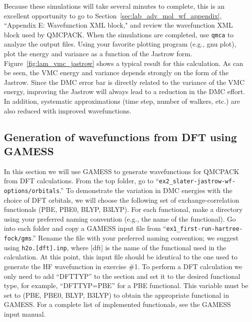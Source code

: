 Because these simulations will take several minutes to complete, this is an excellent opportunity
to go to Section~\ref{sec:lab_adv_mol_wf_appendix}, ``Appendix E: Wavefunction XML block," and review the wavefunction XML block used by QMCPACK. When the
simulations are completed, use \texttt{qmca} to analyze the output files. Using your favorite plotting
program (e.g., gnu plot), plot the energy and variance as a function of the Jastrow form.
Figure~\ref{fig:lam_vmc_jastrow} shows a typical result for this calculation. As can be seen, the VMC energy and
variance depends strongly on the form of the Jastrow. Since the DMC error bar is directly
related to the variance of the VMC energy, improving the Jastrow will always lead to a
reduction in the DMC effort. In addition, systematic approximations (time step, number of
walkers, etc.) are also reduced with improved wavefunctions.


\subsection{Generation of wavefunctions from DFT using GAMESS}
In this section we will use GAMESS to generate wavefunctions for QMCPACK from
DFT calculations. From the top folder, go to ``\texttt{ex2\_slater-jastrow-wf-options/orbitals}.'' To demonstrate
the variation in DMC energies with the choice of DFT orbitals, we will choose the following
set of exchange-correlation functionals (PBE, PBE0, BLYP, B3LYP). For each functional,
make a directory using your preferred naming convention (e.g., the name of the functional).
Go into each folder and copy a GAMESS input file from %
``\texttt{ex1\_first-run-hartree-fock/gms}.'' %
 Rename the file with your preferred naming convention; we suggest using \texttt{h2o.[dft].inp}, where [dft] is the name of
the functional used in the calculation. At this point, this input file should be identical to the
one used to generate the HF wavefunction in exercise \#1. To perform a DFT
calculation we only need to add ``DFTTYP'' to the  section and set
it to the desired functional type, for example, ``DFTTYP=PBE'' for a PBE functional. This
variable must be set to (PBE, PBE0, BLYP, B3LYP) to obtain the appropriate functional in
GAMESS. For a complete list of implemented functionals, see the GAMESS input manual.


